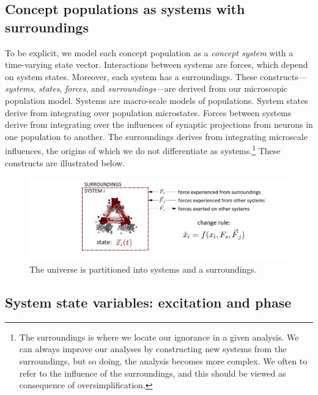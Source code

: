 \subsection{{\textbf{Concept populations as systems with surroundings}}} 

To be explicit, we model each concept population as a \textit{concept system} with a time-varying state vector. Interactions between systems are forces, which depend on system states. Moreover, each system has a surroundings. These constructs—\textit{systems}, \textit{states}, \textit{forces}, and \textit{surroundings}—are derived from our microscopic population model. Systems are macro-scale models of populations. System states derive from integrating over population microstates. Forces between systems derive from integrating over the influences of synaptic projections from neurons in one population to another. The surroundings derives from integrating microscale influences, the origins of which we do not differentiate as systems.\footnote{The surroundings is where we locate our ignorance in a given analysis. We can always improve our analyses by constructing new systems from the surroundings, but so doing, the analysis becomes more complex. We often to refer to the influence of the surroundings, and this should be viewed as consequence of oversimplification.} These constructs are illustrated below.

  
\begin{figure}
\includegraphics[width=\textwidth]{figures/Tilsen-img11.png}
\caption{The universe is partitioned into systems and a surroundings.}
\label{fig:2:4}
\end{figure}
 

\subsection{System state variables: excitation and phase}

